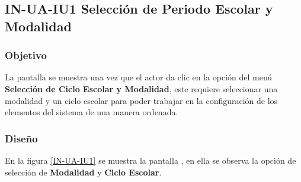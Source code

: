 \subsection{IN-UA-IU1 Selección de Periodo Escolar y Modalidad}

\subsubsection{Objetivo}
		
	La pantalla  se muestra una vez que el actor da clic en la opción del menú \textbf{Selección de Ciclo Escolar y Modalidad}, este requiere seleccionar una modalidad y un ciclo escolar para poder trabajar en la configuración de los elementos del sistema de una manera ordenada.

\subsubsection{Diseño}
    
    En la figura \ref{IN-UA-IU1} se muestra la pantalla , en ella se observa la opción de selección de \textbf{Modalidad} y \textbf{Ciclo Escolar}.


